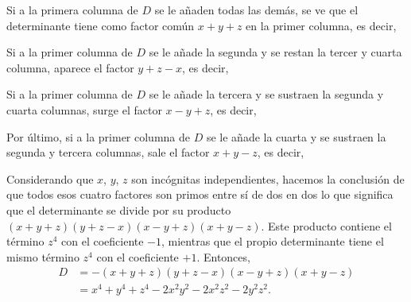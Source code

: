 \begin{examplebox}{}{}
    \tcblower
    \solucion Si a la primera columna de $D$ se le añaden todas las demás, se ve que el determinante tiene como factor común $x + y + z$ en la primer columna, es decir,
    \begin{matrizn}
    \end{matrizn}
    Si a la primer columna de $D$ se le añade la segunda y se restan la tercer y cuarta columna, aparece el factor $y + z - x$, es decir,
    \begin{matrizn}
    \end{matrizn}
    \newpage
    Si a la primer columna de $D$ se le añade la tercera y se sustraen la segunda y cuarta columnas, surge el factor $x - y + z$, es decir,
    \begin{matrizn}
    \end{matrizn}
    Por último, si a la primer columna de $D$ se le añade la cuarta y se sustraen la segunda y tercera columnas, sale el factor $x + y - z$, es decir,
    \begin{matrizn}
    \end{matrizn}
    Considerando que $x$, $y$, $z$ son incógnitas independientes, hacemos la conclusión de que todos esos cuatro factores son primos entre sí de dos en dos lo que significa que el determinante se divide por su producto $(x + y + z)(y + z - x)(x - y + z)(x + y - z)$. Este producto contiene el término $z^4$ con el coeficiente $-1$, mientras que el propio determinante tiene el mismo término $z^4$ con el coeficiente $+1$. Entonces,
    \begin{align*}
        D & = -(x + y + z)(y + z - x)(x - y + z)(x + y - z) \\
        & = x^4 + y^4 + z^4 - 2x^2y^2 - 2x^2z^2 - 2y^2z^2.
    \end{align*}
\end{examplebox}

